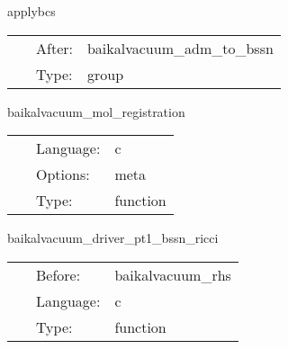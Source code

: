 \vspace{5mm}


\hspace{5mm} applybcs 

\hspace{5mm}{\it apply boundary conditions } 


\hspace{5mm}

 \begin{tabular*}{160mm}{cll} 
~ & After:  & baikalvacuum\_adm\_to\_bssn \\ 
~ & Type:  & group \\ 
\end{tabular*} 


\vspace{5mm}


\hspace{5mm} baikalvacuum\_mol\_registration 

\hspace{5mm}{\it register variables for mol } 


\hspace{5mm}

 \begin{tabular*}{160mm}{cll} 
~ & Language:  & c \\ 
~ & Options:  & meta \\ 
~ & Type:  & function \\ 
\end{tabular*} 


\vspace{5mm}


\hspace{5mm} baikalvacuum\_driver\_pt1\_bssn\_ricci 

\hspace{5mm}{\it mol: compute ricci tensor } 


\hspace{5mm}

 \begin{tabular*}{160mm}{cll} 
~ & Before:  & baikalvacuum\_rhs \\ 
~ & Language:  & c \\ 
~ & Type:  & function \\ 
\end{tabular*} 


\vspace{5mm}

